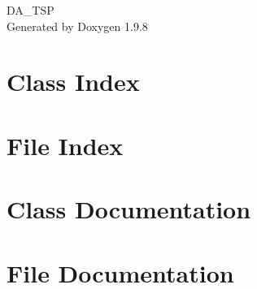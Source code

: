\documentclass[twoside]{book}
\newcommand{\+}{\discretionary{\mbox{\scriptsize$\hookleftarrow$}}{}{}}
\newcommand{\clearemptydoublepage}{%
    \newpage{\pagestyle{empty}\cleardoublepage}%
  }
\begin{document}
  \raggedbottom
    \hypersetup{pageanchor=false,
                bookmarksnumbered=true,
                pdfencoding=unicode
               }
  \begin{titlepage}
  \vspace*{7cm}
  \begin{center}%
  {\Large DA\+\_\+\+TSP}\\
  \vspace*{1cm}
  {\large Generated by Doxygen 1.9.8}\\
  \end{center}
  \end{titlepage}
  \clearemptydoublepage
  \tableofcontents
  \clearemptydoublepage
  \hypersetup{pageanchor=true}

\chapter{Class Index}

\chapter{File Index}

\chapter{Class Documentation}





\chapter{File Documentation}





  \backmatter
  \newpage
  \clearemptydoublepage
  \printindex
\end{document}
